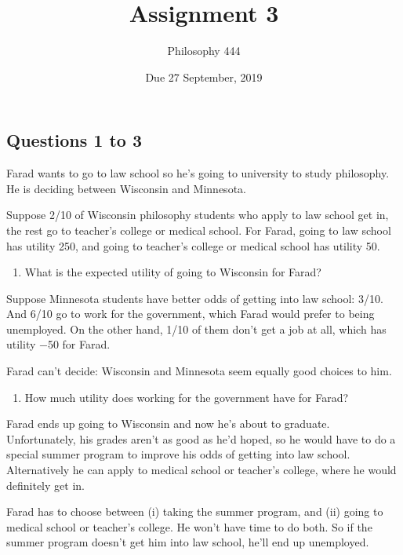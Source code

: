 \documentclass[
  11pt,
]{article}
\title{Assignment 3}
\author{Philosophy 444}
\date{Due 27 September, 2019}
\providecommand{\tightlist}{%
  \setlength{\itemsep}{0pt}\setlength{\parskip}{0pt}}
\begin{document}
\maketitle

\hypertarget{questions-1-to-3}{%
\subsection{Questions 1 to 3}\label{questions-1-to-3}}

Farad wants to go to law school so he's going to university to study
philosophy. He is deciding between Wisconsin and Minnesota.

Suppose 2/10 of Wisconsin philosophy students who apply to law school
get in, the rest go to teacher's college or medical school. For Farad,
going to law school has utility 250, and going to teacher's college or
medical school has utility 50.

\begin{enumerate}
\def\labelenumi{\arabic{enumi}.}
\tightlist
\item
  What is the expected utility of going to Wisconsin for Farad?
\end{enumerate}

Suppose Minnesota students have better odds of getting into law school:
3/10. And 6/10 go to work for the government, which Farad would prefer
to being unemployed. On the other hand, 1/10 of them don't get a job at
all, which has utility −50 for Farad.

Farad can't decide: Wisconsin and Minnesota seem equally good choices to
him.

\begin{enumerate}
\def\labelenumi{\arabic{enumi}.}
\setcounter{enumi}{1}
\tightlist
\item
  How much utility does working for the government have for Farad?
\end{enumerate}

Farad ends up going to Wisconsin and now he's about to graduate.
Unfortunately, his grades aren't as good as he'd hoped, so he would have
to do a special summer program to improve his odds of getting into law
school. Alternatively he can apply to medical school or teacher's
college, where he would definitely get in.

Farad has to choose between (i) taking the summer program, and (ii)
going to medical school or teacher's college. He won't have time to do
both. So if the summer program doesn't get him into law school, he'll
end up unemployed.
\end{document}
